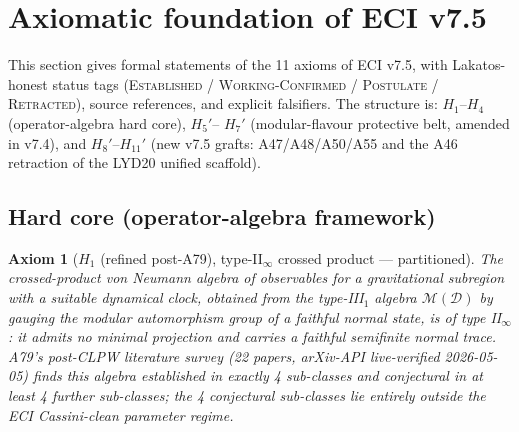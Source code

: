 \documentclass[a4paper,11pt]{article}
\newtheorem*{axiom*}{Axiom}
\theoremstyle{definition}
\theoremstyle{remark}
\begin{document}
\section{Axiomatic foundation of ECI v7.5}
\label{sec:axioms-v75}

This section gives formal statements of the 11 axioms of ECI v7.5,
with Lakatos-honest status tags (\textsc{Established} /
\textsc{Working-Confirmed} / \textsc{Postulate} / \textsc{Retracted}),
source references, and explicit falsifiers.
The structure is: $H_1$--$H_4$ (operator-algebra hard core), $H_5'$--%
$H_7'$ (modular-flavour protective belt, amended in v7.4), and
$H_8'$--$H_{11}'$ (new v7.5 grafts: A47/A48/A50/A55 and the A46
retraction of the LYD20 unified scaffold).

\subsection{Hard core (operator-algebra framework)}
\label{sec:axioms-hardcore}

\begin{axiom*}[$H_1$ \textup{(refined post-A79)}, type-II$_\infty$
               crossed product --- partitioned]
The crossed-product von Neumann algebra of observables for a
gravitational subregion with a suitable dynamical clock, obtained
from the type-III$_1$ algebra $\mathcal{M}(\mathcal{D})$ by gauging
the modular automorphism group of a faithful normal state, is of type
II$_\infty$: it admits no minimal projection and carries a faithful
semifinite normal trace.  A79's post-CLPW literature survey
(22 papers, arXiv-API live-verified 2026-05-05) finds this algebra
\emph{established} in exactly 4 sub-classes and \emph{conjectural}
in at least 4 further sub-classes; the 4 conjectural sub-classes lie
entirely outside the ECI Cassini-clean parameter regime.
\end{axiom*}
\end{document}
